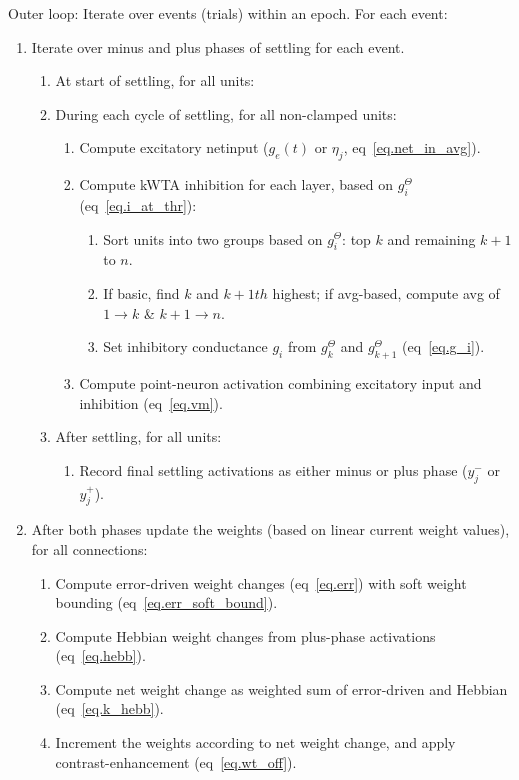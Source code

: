 \documentclass[12pt,twoside]{article}
\begin{document}
Outer loop: Iterate over events (trials) within an epoch.  For each event:
\begin{enumerate}
\item Iterate over minus and plus phases of settling for each event.
  \begin{enumerate}
  \item At start of settling, for all units:
  \item During each cycle of settling, for all non-clamped units:
    \begin{enumerate}
    \item Compute excitatory netinput ($g_e(t)$ or $\eta_j$,
      eq~\ref{eq.net_in_avg}).
    \item Compute kWTA inhibition for each layer, based on $g_i^{\Theta}$
      (eq~\ref{eq.i_at_thr}):
      \begin{enumerate}
      \item Sort units into two groups based on $g_i^{\Theta}$: top $k$ and
        remaining $k+1$ to $n$.
      \item If basic, find $k$ and $k+1th$ highest; if
        avg-based, compute avg of $1\rightarrow k$ \& $k+1
        \rightarrow n$.
      \item Set inhibitory conductance $g_i$ from $g^{\Theta}_k$ and
        $g^{\Theta}_{k+1}$ (eq~\ref{eq.g_i}).
      \end{enumerate}
    \item Compute point-neuron activation combining excitatory input and
      inhibition (eq~\ref{eq.vm}).
    \end{enumerate}
  \item After settling, for all units:
    \begin{enumerate}
    \item Record final settling activations as either minus or plus
      phase ($y^-_j$ or $y^+_j$).
    \end{enumerate}
  \end{enumerate}
  \item After both phases update the weights (based on linear current
    weight values), for all connections:
  \begin{enumerate}
  \item Compute error-driven weight changes (eq~\ref{eq.err}) with
    soft weight bounding (eq~\ref{eq.err_soft_bound}).
  \item Compute Hebbian weight changes from plus-phase activations
    (eq~\ref{eq.hebb}).
  \item Compute net weight change as weighted sum of error-driven and
    Hebbian (eq~\ref{eq.k_hebb}).
  \item Increment the weights according to net weight change, and
    apply contrast-enhancement (eq~\ref{eq.wt_off}).
  \end{enumerate}
\end{enumerate}
\end{document}
